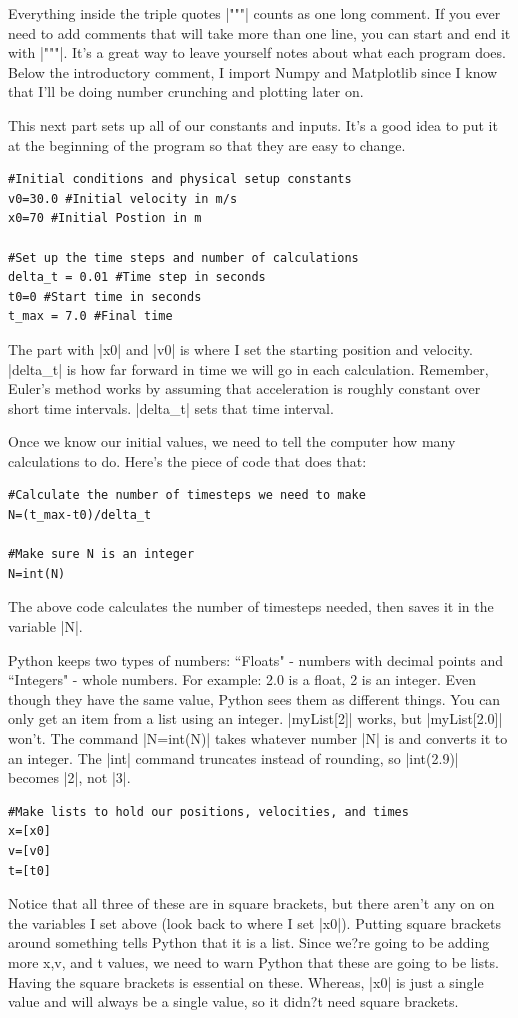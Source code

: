 \documentclass{book}
\begin{document}
Everything inside the triple quotes |"""| counts as one long comment.  If you ever need to add comments that will take more than one line, you can start and end it with |"""|.  It's a great way to leave yourself notes about what each program does.
Below the introductory comment, I import Numpy and Matplotlib since I know that I'll be doing number crunching and plotting later on.

This next part sets up all of our constants and inputs.  It's a good idea to put it at the beginning of the program so that they are easy to change.
\begin{lstlisting}
#Initial conditions and physical setup constants
v0=30.0 #Initial velocity in m/s
x0=70 #Initial Postion in m

#Set up the time steps and number of calculations
delta_t = 0.01 #Time step in seconds
t0=0 #Start time in seconds
t_max = 7.0 #Final time

\end{lstlisting}

The part with |x0| and |v0| is where I set the starting position and velocity.  |delta_t| is how far forward in time we will go in each calculation.  Remember, Euler's method works by assuming that acceleration is roughly constant over short time intervals.  |delta_t| sets that time interval.

Once we know our initial values, we need to tell the computer how many calculations to do.  Here's the piece of code that does that:

\begin{lstlisting}
#Calculate the number of timesteps we need to make
N=(t_max-t0)/delta_t

#Make sure N is an integer
N=int(N)
\end{lstlisting}

The above code calculates the number of timesteps needed, then saves it in the variable |N|. 

Python keeps two types of numbers: ``Floats" - numbers with decimal points and ``Integers" - whole numbers. For example: 2.0 is a float, 2 is an integer.  Even though they have the same value, Python sees them as different things.
You can only get an item from a list using an integer.
|myList[2]| works, but |myList[2.0]| won't.  The command |N=int(N)| takes whatever number |N| is and converts it to an integer.  The |int| command truncates instead of rounding, so |int(2.9)| becomes |2|, not |3|.

\begin{lstlisting}
#Make lists to hold our positions, velocities, and times
x=[x0]
v=[v0]
t=[t0]

\end{lstlisting}
Notice that all three of these are in square brackets, but there aren't any on on the variables I set above (look back to where I set |x0|).  
Putting square brackets around something tells Python that it is a list.  Since we?re going to be adding more x,v, and t values, we need to warn Python that these are going to be lists.
Having the square brackets is essential on these. Whereas, |x0| is just a single value and will always be a single value, so it didn?t need square brackets.
\end{document}
